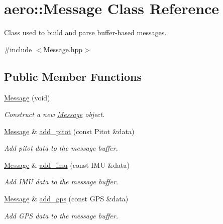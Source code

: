 \hypertarget{classaero_1_1Message}{}\section{aero\+:\+:Message Class Reference}
\label{classaero_1_1Message}


Class used to build and parse buffer-\/based messages.  




{\ttfamily \#include $<$Message.\+hpp$>$}

\subsection*{Public Member Functions}
\begin{DoxyCompactItemize}
\item 
\mbox{\label{classaero_1_1Message_a6542ad570418425c3299ae5ce2936b76}} 
\hyperlink{classaero_1_1Message_a6542ad570418425c3299ae5ce2936b76}{Message} (void)
\begin{DoxyCompactList}\small\item\em Construct a new \hyperlink{classaero_1_1Message}{Message} object. \end{DoxyCompactList}\item 
\hyperlink{classaero_1_1Message}{Message} \& \hyperlink{classaero_1_1Message_a7b6213ffe715f032ff1301ae8192a338}{add\+\_\+pitot} (const Pitot \&data)
\begin{DoxyCompactList}\small\item\em Add pitot data to the message buffer. \end{DoxyCompactList}\item 
\hyperlink{classaero_1_1Message}{Message} \& \hyperlink{classaero_1_1Message_a88dbae0c7efc25c6cba13c8448d1b4a1}{add\+\_\+imu} (const I\+MU \&data)
\begin{DoxyCompactList}\small\item\em Add I\+MU data to the message buffer. \end{DoxyCompactList}\item 
\hyperlink{classaero_1_1Message}{Message} \& \hyperlink{classaero_1_1Message_a2da23dcc2855e77e39f9dd2306e773a3}{add\+\_\+gps} (const G\+PS \&data)
\begin{DoxyCompactList}\small\item\em Add G\+PS data to the message buffer. \end{DoxyCompactList}\item 

\end{DoxyCompactItemize}
